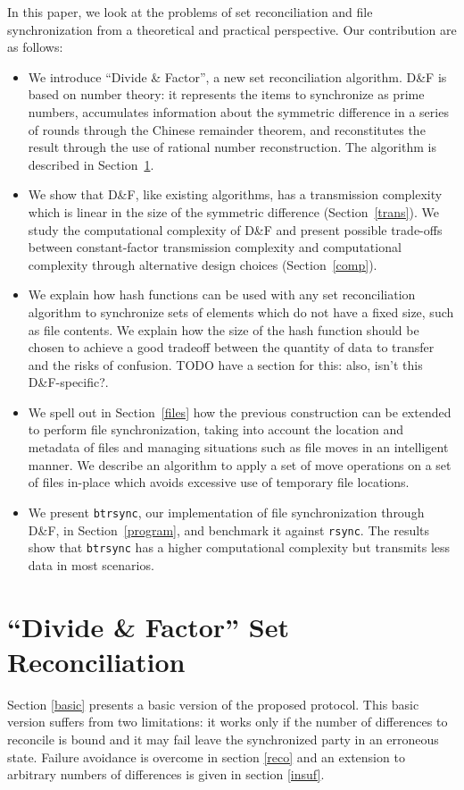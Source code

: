 \documentclass[11pt]{llncs}
\newcommand{\btrsync}{\texttt{btrsync}\xspace}
\newcommand{\rsync}{\texttt{rsync}\xspace}
\begin{document}
In this paper, we look at the problems of set reconciliation and file
synchronization from a theoretical and practical perspective. Our contribution
are as follows:
\begin{itemize}
  \item We introduce ``Divide \& Factor'', a new set reconciliation algorithm.
    D\&F is based on number theory: it represents the items to synchronize as
    prime numbers, accumulates information about the symmetric difference in
    a series of rounds through the Chinese remainder theorem, and reconstitutes
    the result through the use of rational number reconstruction. The algorithm
    is described in Section~\ref{dandf}.
  \item We show that D\&F, like existing algorithms, has a transmission
    complexity which is linear in the size of the symmetric difference
    (Section~\ref{trans}). We study the computational complexity of D\&F and
    present possible trade-offs between constant-factor transmission complexity
    and computational complexity through alternative design choices
    (Section~\ref{comp}).
  \item We explain how hash functions can be used with any set reconciliation
    algorithm to synchronize sets of elements which do not have a fixed size,
    such as file contents. We explain how the size of the hash function should
    be chosen to achieve a good tradeoff between the quantity of data to
    transfer and the risks of confusion. TODO have a section for this: also,
    isn't this D\&F-specific?.
  \item We spell out in Section~\ref{files} how the previous construction can be
    extended to perform file synchronization, taking into account the location
    and metadata of files and managing situations such as file moves in an
    intelligent manner. We describe an algorithm to apply a set of move
    operations on a set of files in-place which avoids excessive use of
    temporary file locations.
  \item We present \btrsync, our implementation of file synchronization through
    D\&F, in Section~\ref{program}, and benchmark it against \rsync. The results
    show that \btrsync has a higher computational complexity but transmits less
    data in most scenarios.
\end{itemize}

\section{``Divide \& Factor'' Set Reconciliation}
\label{dandf}
Section \ref{basic} presents a basic
version of the proposed protocol. This basic version suffers from two
limitations: it works only if the number of differences to reconcile is bound
and it may fail leave the synchronized party in an erroneous state. Failure
avoidance is overcome in section \ref{reco} and an extension to arbitrary
numbers of differences is given in section \ref{insuf}.
\end{document}
